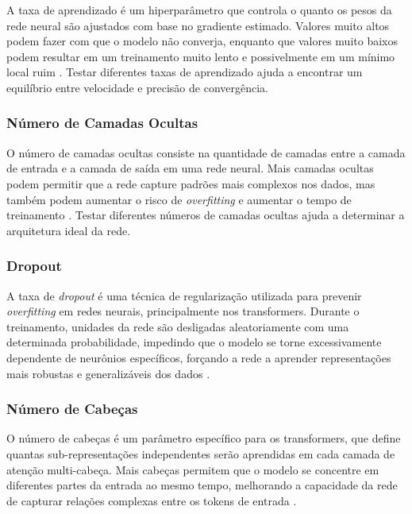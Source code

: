 \documentclass[conference]{IEEEtran}
\begin{document}
A taxa de aprendizado é um hiperparâmetro que controla o quanto os pesos da rede neural são ajustados com base no gradiente estimado. Valores muito altos podem fazer com que o modelo não converja, enquanto que valores muito baixos podem resultar em um treinamento muito lento e possivelmente em um mínimo local ruim \cite{lr}. Testar diferentes taxas de aprendizado ajuda a encontrar um equilíbrio entre velocidade e precisão de convergência. \\

\subsubsection{Número de Camadas Ocultas}

O número de camadas ocultas consiste na quantidade de camadas entre a camada de entrada e a camada de saída em uma rede neural. Mais camadas ocultas podem permitir que a rede capture padrões mais complexos nos dados, mas também podem aumentar o risco de \textit{overfitting} e aumentar o tempo de treinamento \cite{hid}. Testar diferentes números de camadas ocultas ajuda a determinar a arquitetura ideal da rede. \\

\subsubsection{Dropout}

A taxa de \textit{dropout} é uma técnica de regularização utilizada para prevenir \textit{overfitting} em redes neurais, principalmente nos transformers. Durante o treinamento, unidades da rede são desligadas aleatoriamente com uma determinada probabilidade, impedindo que o modelo se torne excessivamente dependente de neurônios específicos, forçando a rede a aprender representações mais robustas e generalizáveis dos dados \cite{dro}. \\

\subsubsection{Número de Cabeças}

O número de cabeças é um parâmetro específico para os transformers, que define quantas sub-representações independentes serão aprendidas em cada camada de atenção multi-cabeça. Mais cabeças permitem que o modelo se concentre em diferentes partes da entrada ao mesmo tempo, melhorando a capacidade da rede de capturar relações complexas entre os tokens de entrada \cite{nca}.
\end{document}
